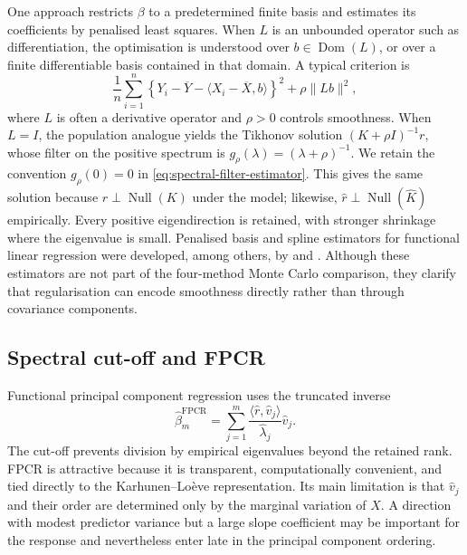One approach restricts $\beta$ to a predetermined finite basis and estimates its coefficients by penalised least squares. When $L$ is an unbounded operator such as differentiation, the optimisation is understood over $b\in\operatorname{Dom}(L)$, or over a finite differentiable basis contained in that domain. A typical criterion is
\begin{equation}
    \frac1n\sum_{i=1}^{n}
    \left\{Y_i-\overline Y-\langle X_i-\overline X,b\rangle\right\}^2
    +\rho\|Lb\|^2,
    \label{eq:roughness-penalised-risk}
\end{equation}
where $L$ is often a derivative operator and $\rho>0$ controls smoothness. When $L=I$, the population analogue yields the Tikhonov solution $(K+\rho I)^{-1}r$, whose filter on the positive spectrum is $g_\rho(\lambda)=(\lambda+\rho)^{-1}$. We retain the convention $g_\rho(0)=0$ in \eqref{eq:spectral-filter-estimator}. This gives the same solution because $r\perp\operatorname{Null}(K)$ under the model; likewise, $\widehat r\perp\operatorname{Null}(\widehat K)$ empirically. Every positive eigendirection is retained, with stronger shrinkage where the eigenvalue is small. Penalised basis and spline estimators for functional linear regression were developed, among others, by \textcite{cardot_ferraty_sarda_2003} and \textcite{crambes_kneip_sarda_2009}. Although these estimators are not part of the four-method Monte Carlo comparison, they clarify that regularisation can encode smoothness directly rather than through covariance components.

\subsection{Spectral cut-off and FPCR}

Functional principal component regression uses the truncated inverse
\begin{equation}
    \widehat\beta_m^{\mathrm{FPCR}}
    =\sum_{j=1}^{m}
      \frac{\langle\widehat r,\widehat v_j\rangle}
           {\widehat\lambda_j}\widehat v_j.
    \label{eq:fpcr-background}
\end{equation}
The cut-off prevents division by empirical eigenvalues beyond the retained rank. FPCR is attractive because it is transparent, computationally convenient, and tied directly to the Karhunen--Lo\`eve representation. Its main limitation is that $\widehat v_j$ and their order are determined only by the marginal variation of $X$. A direction with modest predictor variance but a large slope coefficient may be important for the response and nevertheless enter late in the principal component ordering.

